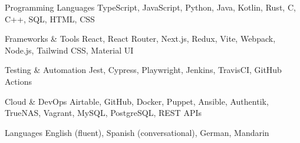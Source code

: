 

\begin{cvskills}

  \cvskill
    {Programming Languages} %
    {TypeScript, JavaScript, Python, Java, Kotlin, Rust, C, C++, SQL, HTML, CSS} %

  \cvskill
    {Frameworks \& Tools} %
    {React, React Router, Next.js, Redux, Vite, Webpack, Node.js, Tailwind CSS, Material UI} %

  \cvskill
    {Testing \& Automation} %
    {Jest, Cypress, Playwright, Jenkins, TravisCI, GitHub Actions} %

  \cvskill
    {Cloud \& DevOps} %
    {Airtable, GitHub, Docker, Puppet, Ansible, Authentik, TrueNAS, Vagrant, MySQL, PostgreSQL, REST APIs} %

  \cvskill
    {Languages} %
    {English (fluent), Spanish (conversational), German, Mandarin} %

\end{cvskills}
